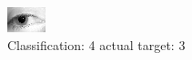 \begin{figure}[h!]
\begin{center}
\includegraphics[width=0.60\columnwidth]{figures/ID1294_class_4_target_3.png}
\end{center}
\caption{ Classification: 4 actual target: 3}
\label{fig:ID1294_class_4_target_3}
\end{figure}
